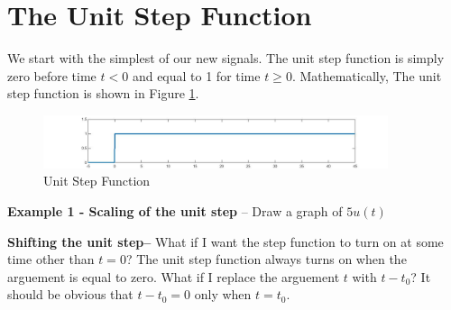 \documentclass{handout}
\begin{document}
\section{The Unit Step Function}
We start with the simplest of our new signals.  The unit step function is simply zero before time $t<0$ and equal to 1 for time $t\ge0$.  Mathematically,
The unit step function is shown in Figure \ref{fig: UnitStep}.
\begin{figure} [h!]
\centering
\includegraphics[width=0.9\textwidth]{UnitStep.jpg}
\caption{Unit Step Function}
\label{fig: UnitStep}
\end{figure}

\textbf{Example 1 - Scaling of the unit step} -- Draw a graph of $5u(t)$


\textbf{Shifting the unit step--}  What if I want the step function to turn on at some time other than $t=0$? The unit step function always turns on when the arguement is equal to zero.  What if I replace the arguement $t$ with $t - t_0$? It should be obvious that $t-t_0=0$ only when $t=t_0$.
\end{document}
